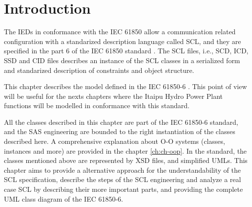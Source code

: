 \section{Introduction}

The \glspl{IED} in conformance with the 
IEC 61850 allow a communication related 
configuration with 
a standarized description language 
called \gls{SCL}, and they are specified 
in the part 6 of 
the IEC 61850 standard \cite{IEC61850-6:2004}.
The \gls{SCL} files, i.e., 
\gls{SCD}, \gls{ICD}, \gls{SSD} and \gls{CID} 
files describes an instance of the 
\gls{SCL} classes in a serialized form 
and standarized description of constraints and object structure. 

This chapter describes the model defined 
in the IEC 61850-6 \cite{IEC61850-6:2004}. This 
point of view will be useful for the 
nexts chapters where the Itaipu Hydro Power Plant 
functions will be modelled in conformance 
with this standard. 

All the classes described in this chapter are part 
of the IEC 61850-6 standard, and the SAS 
engineering are bounded to the right instantiation 
of the classes described here. A comprehensive explanation 
about \gls{O-O} systems (classes, instances and more) 
are provided in the chapter \ref{ch:ch-oop}.
In the standard, 
the classes mentioned above are represented 
by \gls{XSD} files,
and simplified \glspl{UML}. This chapter aims to 
provide a alternative approach for 
the understandability of the \gls{SCL} specification, 
describe the steps of the \gls{SCL} engineering 
and analyze a real case SCL by describing their 
more important parts, and providing the 
complete \gls{UML} class diagram of the IEC 61850-6.



